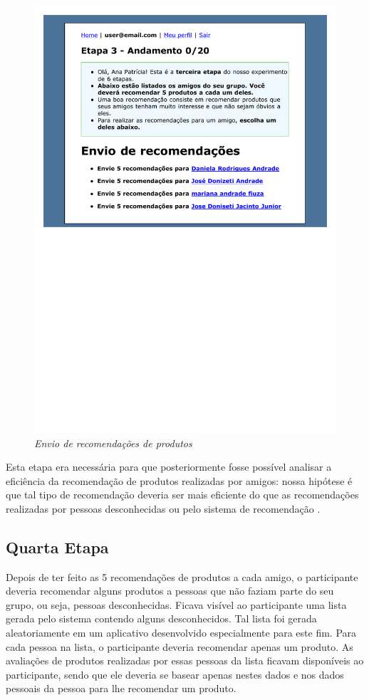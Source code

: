 \begin{figure}[htp]
  \centering
  \includegraphics[width=\textwidth]{imagens/stage-3}
  \caption{\it Envio de recomendações de produtos}
  \label{fig:stage-3}
\end{figure}

Esta etapa era necessária para que posteriormente fosse possível analisar a eficiência da recomendação de produtos realizadas por amigos: nossa hipótese é que tal tipo de recomendação deveria ser mais eficiente do que as recomendações realizadas por pessoas desconhecidas ou pelo sistema de recomendação \cite{bonhard2007devil}.

\subsection{Quarta Etapa}

Depois de ter feito as 5 recomendações de produtos a cada amigo, o participante deveria recomendar alguns produtos a pessoas que não faziam parte do seu grupo, ou seja, pessoas desconhecidas. Ficava visível ao participante uma lista gerada pelo sistema contendo alguns desconhecidos. Tal lista foi gerada aleatoriamente em um aplicativo desenvolvido especialmente para este fim. Para cada pessoa na lista, o participante deveria recomendar apenas um produto. As avaliações de produtos realizadas por essas pessoas da lista ficavam disponíveis ao participante, sendo que ele deveria se basear apenas nestes dados e nos dados pessoais da pessoa para lhe recomendar um produto.

